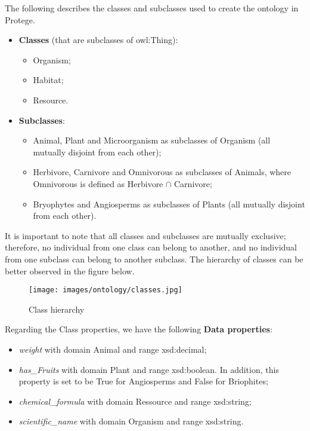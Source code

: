 

The following describes the classes and subclasses used to create the ontology in Protege.
\bigskip


\begin{itemize}
    \item \textbf{Classes} (that are subclasses of owl:Thing):
    \begin{itemize}
        \item Organism;

        \item Habitat;

        \item Resource.
        \bigskip
    \end{itemize}

    \item \textbf{Subclasses}:
    \begin{itemize}
        \item Animal, Plant and Microorganism as subclasses of Organism (all mutually disjoint from each other);

        \item Herbivore, Carnivore and Omnivorous as subclasses of Animals, where Omnivorous is defined as Herbivore $\cap$ Carnivore;

        \item Bryophytes and  Angiosperms as subclasses of Plants (all mutually disjoint from each other).
        \bigskip
    \end{itemize} 
\end{itemize}

It is important to note that all classes and subclasses are mutually exclusive; therefore, no individual from one class can belong to another, and no individual from one subclass can belong to another subclass. The hierarchy of classes can be better observed in the figure below.

\begin{figure}[H]
    \centering
    \texttt{[image: images/ontology/classes.jpg]}
    \caption{Class hierarchy}
    \label{fig:class}
\end{figure}


Regarding the Class properties, we have the following \textbf{Data properties}:
\bigskip

    \begin{itemize}
        \item \textit{weight} with domain Animal and range xsd:decimal;

        \item \textit{has\_Fruits} with domain Plant and range xsd:boolean. In addition, this property is set to be True for Angiosperms and False for Briophites;

        \item \textit{chemical\_formula} with domain Ressource and range xsd:string;

        \item \textit{scientific\_name} with domain Organism and range xsd:string.
        \bigskip

    \end{itemize}


